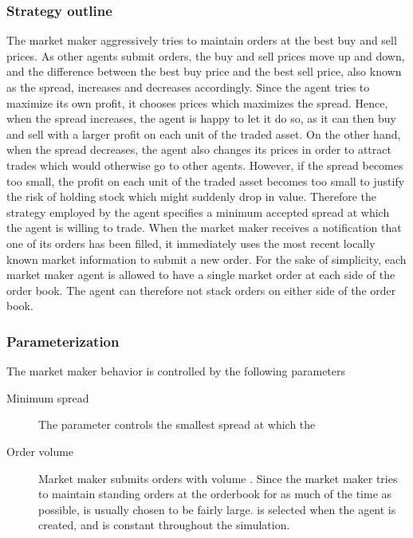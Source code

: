 \subsubsection{Strategy outline}
The market maker aggressively tries to maintain orders at the best buy and sell prices. As other agents submit orders, the buy and sell prices move up and down, and the difference between the best buy price and the best sell price, also known as the spread, increases and decreases accordingly. Since the agent tries to maximize its own profit, it chooses prices which maximizes the spread. Hence, when the spread increases, the agent is happy to let it do so, as it can then buy and sell with a larger profit on each unit of the traded asset. On the other hand, when the spread decreases, the agent also changes its prices in order to attract trades which would otherwise go to other agents. However, if the spread becomes too small, the profit on each unit of the traded asset becomes too small to justify the risk of holding stock which might suddenly drop in value. Therefore the strategy employed by the agent specifies a minimum accepted spread at which the agent is willing to trade. When the market maker receives a notification that one of its orders has been filled, it immediately uses the most recent locally known market information to submit a new order. For the sake of simplicity, each market maker agent is allowed to have a single market order at each side of the order book. The agent can therefore not stack orders on either side of the order book. 

\subsubsection{Parameterization}
The market maker behavior is controlled by the following parameters
\begin{description}
\item[Minimum spread] The parameter  controls the smallest spread at which the 
\item[Order volume] Market maker  submits orders with volume . Since the market maker tries to maintain standing orders at the orderbook for as much of the time as possible,  is usually chosen to be fairly large.  is selected when the agent is created, and is constant throughout the simulation.
\end{description}


